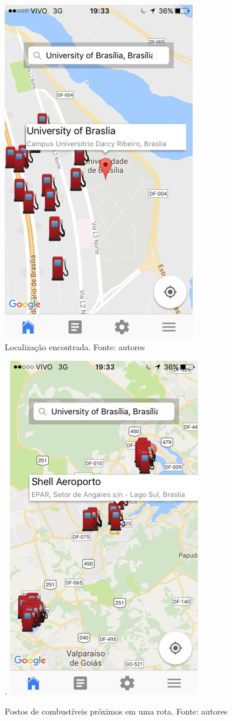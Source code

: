 \begin{figure}[H]
    \centering
    \includegraphics[scale=0.5]{figuras/app_4.jpg}
    \caption[Localização encontrada]{Localização encontrada. Fonte: autores}
    \label{img:localizacao_encontrada}
\end{figure}

\begin{figure}[H]
    \centering.
    \includegraphics[scale=0.5]{figuras/app_5.jpg}
    \caption[Postos de combustíveis próximos em uma rota]{Postos de combustíveis próximos em uma rota. Fonte: autores}
    \label{img:postos_de_gasolina_proximos_em_uma_rota}
\end{figure}
